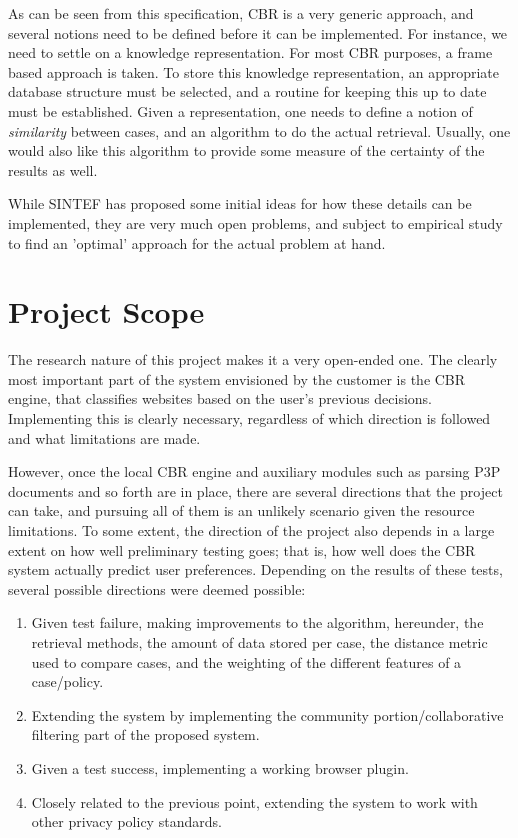 As can be seen from this specification, CBR is a very generic approach, and several notions need to be defined before it can be implemented. For instance, we need to settle on a knowledge representation. For most CBR purposes, a frame based approach is taken. To store this knowledge representation, an appropriate database structure must be selected, and a routine for keeping this up to date must be established. Given a representation, one needs to define a notion of \emph{similarity} between cases, and an algorithm to do the actual retrieval. Usually, one would also like this algorithm to provide some measure of the certainty of the results as well.

While SINTEF has proposed some initial ideas for how these details can be implemented, they are very much open problems, and subject to empirical study to find an 'optimal' approach for the actual problem at hand.

\section{Project Scope}
The research nature of this project makes it a very open-ended one. The clearly most important part of the system envisioned by the customer is the CBR engine, that classifies websites based on the user's previous decisions. Implementing this is clearly necessary, regardless of which direction is followed and what limitations are made.

However, once the local CBR engine and auxiliary modules such as parsing P3P documents and so forth are in place, there are several directions that the project can take, and pursuing all of them is an unlikely scenario given the resource limitations. To some extent, the direction of the project also depends in a large extent on how well preliminary testing goes; that is, how well does the CBR system actually predict user preferences. Depending on the results of these tests, several possible directions were deemed possible:

\begin{enumerate}
\item Given test failure, making improvements to the algorithm, hereunder, the retrieval methods, the amount of data stored per case, the distance metric used to compare cases, and the weighting of the different features of a case/policy.
\item Extending the system by implementing the community portion/collaborative filtering part of the proposed system.
\item Given a test success, implementing a working browser plugin.
\item Closely related to the previous point, extending the system to work with other privacy policy standards.
\end{enumerate}

